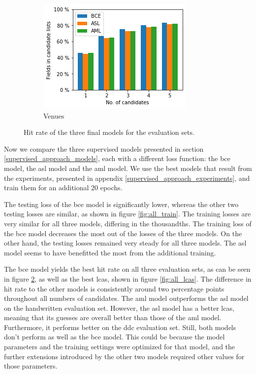 \begin{figure}
\begin{subfigure}[t]{.32\textwidth}
    \includegraphics[width=\textwidth]{figures/supervised_approach/all_venue.png}
    \caption{Venues}
    \label{fig:all_venue}
  \end{subfigure}
  \caption{Hit rate of the three final models for the evaluation sets.}
  \label{fig:all_eval}
\end{figure}

Now we compare the three supervised models presented in section \ref{supervised_approach_models}, each with a different loss function: the \acrshort{bce} model, the \acrshort{asl} model and the \acrshort{aml} model. We use the best models that result from the experiments, presented in appendix \ref{supervised_approach_experiments}, and train them for an additional 20 epochs.

The testing loss of the \acrshort{bce} model is significantly lower, whereas the other two testing losses are similar, as shown in figure \ref{fig:all_train}. The training losses are very similar for all three models, differing in the thousandths. The training loss of the \acrshort{bce} model decreases the most out of the losses of the three models. On the other hand, the testing losses remained very steady for all three models. The \acrshort{asl} model seems to have benefitted the most from the additional training.

The \acrshort{bce} model yields the best hit rate on all three evaluation sets, as can be seen in figure \ref{fig:all_eval}, as well as the best \acrshort{lcas}, shown in figure \ref{fig:all_lcas}. The difference in hit rate to the other models is consistently around two percentage points throughout all numbers of candidates. The \acrshort{aml} model outperforms the \acrshort{asl} model on the handwritten evaluation set.  However, the \acrshort{asl} model has a better \acrshort{lcas}, meaning that its guesses are overall better than those of the \acrshort{aml} model. Furthermore, it performs better on the \acrshort{ddc} evaluation set. Still, both models don't perform as well as the \acrshort{bce} model. This could be because the model parameters and the training settings were optimized for that model, and the further extensions introduced by the other two models required other values for those parameters.

